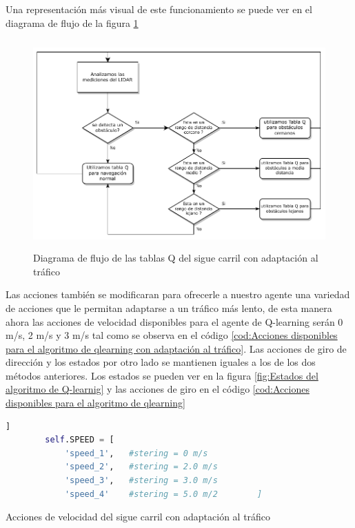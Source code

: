 \bigskip

Una representación más visual de este funcionamiento se puede ver en el diagrama de flujo de la figura \ref{fig:Diagrama de flujo de las tablas Q del algoritmo con adaptación al tráfico}

  \begin{figure}[h]
    \centering
    \includegraphics[height=8cm]{imagenes/cap4/adaptacion_trafico_qlearning/diagrama_tabla_q_trafico.pdf}
    \caption{Diagrama de flujo de las tablas Q del sigue carril con adaptación al tráfico}
    \label{fig:Diagrama de flujo de las tablas Q del algoritmo con adaptación al tráfico}
\end{figure}

Las acciones también se modificaran para ofrecerle a nuestro agente una variedad de acciones que le permitan adaptarse a un tráfico más lento, de esta manera ahora las acciones de velocidad disponibles para el agente de Q-learning serán 0 m/s, 2 m/s y 3 m/s tal como se observa en el código \ref{cod:Acciones disponibles para el algoritmo de qlearning con adaptación al tráfico}. Las acciones de giro de dirección y los estados por otro lado se mantienen iguales a los de los dos métodos anteriores. Los estados se pueden ver en la figura  \ref{fig:Estados del algoritmo de Q-learnig} y las acciones de giro en el código \ref{cod:Acciones disponibles para el algoritmo de qlearning}

    \begin{code}[H]
	\begin{lstlisting}[language=Python]
        ]
        self.SPEED = [ 
            'speed_1',   #stering = 0 m/s  
            'speed_2',   #stering = 2.0 m/s  
            'speed_3',   #stering = 3.0 m/s
            'speed_4'    #stering = 5.0 m/2        ]
	\end{lstlisting}
\caption[Acciones de velocidad del sigue carril con adaptación al tráfico]{Acciones de velocidad del sigue carril con adaptación al tráfico}
\label{cod:Acciones disponibles para el algoritmo de qlearning con adaptación al tráfico}
\end{code}

